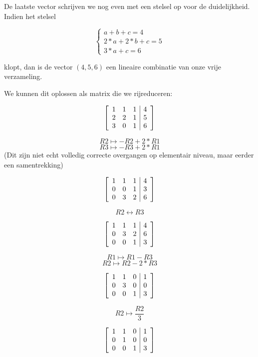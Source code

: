 \documentclass[lineaire_algebra_oplossingen.tex]{subfiles}
\begin{document}
De laatste vector schrijven we nog even met een stelsel op voor de duidelijkheid. Indien het stelsel

\[
\left\{
\begin{array}{l}
a + b + c = 4\\
2*a + 2*b + c = 5\\
3*a + c = 6
\end{array} \right.
\]

klopt, dan is de vector $(4,5,6)$ een lineaire combinatie van onze vrije verzameling.

We kunnen dit oplossen als matrix die we rijreduceren:

\[
\left[
\begin{array}{c c c | c}
1 & 1 & 1 & 4\\
2 & 2 & 1 & 5\\
3 & 0 & 1 & 6
\end{array}
\right]
\]

\[R2 \mapsto -R2 + 2*R1 \]
\[R3 \mapsto -R3 + 2*R1 \]
(Dit zijn niet echt volledig correcte overgangen op elementair niveau, maar eerder een samentrekking)

\[
\left[
\begin{array}{c c c | c}
1 & 1 & 1 & 4\\
0 & 0 & 1 & 3\\
0 & 3 & 2 & 6
\end{array}
\right]
\]

\[R2 \leftrightarrow R3\]

\[
\left[
\begin{array}{c c c | c}
1 & 1 & 1 & 4\\
0 & 3 & 2 & 6\\
0 & 0 & 1 & 3
\end{array}
\right]
\]

\[R1 \mapsto R1 - R3 \]
\[R2 \mapsto R2 - 2*R3 \]

\[
\left[
\begin{array}{c c c | c}
1 & 1 & 0 & 1\\
0 & 3 & 0 & 0\\
0 & 0 & 1 & 3
\end{array}
\right]
\]

\[R2 \mapsto \frac{R2}{3}\]

\[
\left[
\begin{array}{c c c | c}
1 & 1 & 0 & 1\\
0 & 1 & 0 & 0\\
0 & 0 & 1 & 3
\end{array}
\right]
\]
\end{document}
